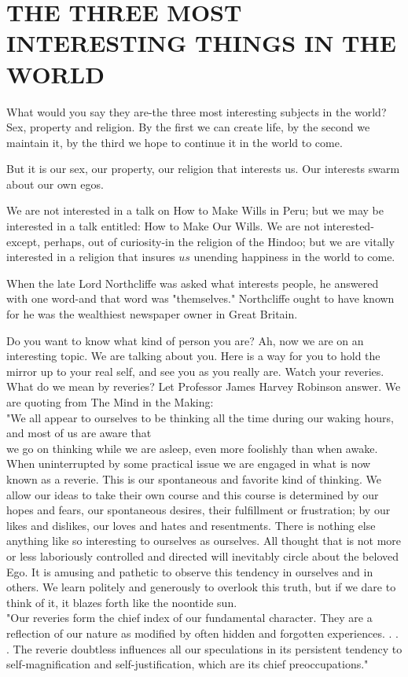\documentclass[10pt]{article}
\begin{document}
\section*{THE THREE MOST INTERESTING THINGS IN THE WORLD}
What would you say they are-the three most interesting subjects in the world? Sex, property and religion. By the first we can create life, by the second we maintain it, by the third we hope to continue it in the world to come.

But it is our sex, our property, our religion that interests us. Our interests swarm about our own egos.

We are not interested in a talk on How to Make Wills in Peru; but we may be interested in a talk entitled: How to Make Our Wills. We are not interested-except, perhaps, out of curiosity-in the religion of the Hindoo; but we are vitally interested in a religion that insures $u s$ unending happiness in the world to come.

When the late Lord Northcliffe was asked what interests people, he answered with one word-and that word was "themselves." Northcliffe ought to have known for he was the wealthiest newspaper owner in Great Britain.

Do you want to know what kind of person you are? Ah, now we are on an interesting topic. We are talking about you. Here is a way for you to hold the mirror up to your real self, and see you as you really are. Watch your reveries. What do we mean by reveries? Let Professor James Harvey Robinson answer. We are quoting from The Mind in the Making:\\
"We all appear to ourselves to be thinking all the time during our waking hours, and most of us are aware that\\
we go on thinking while we are asleep, even more foolishly than when awake. When uninterrupted by some practical issue we are engaged in what is now known as a reverie. This is our spontaneous and favorite kind of thinking. We allow our ideas to take their own course and this course is determined by our hopes and fears, our spontaneous desires, their fulfillment or frustration; by our likes and dislikes, our loves and hates and resentments. There is nothing else anything like so interesting to ourselves as ourselves. All thought that is not more or less laboriously controlled and directed will inevitably circle about the beloved Ego. It is amusing and pathetic to observe this tendency in ourselves and in others. We learn politely and generously to overlook this truth, but if we dare to think of it, it blazes forth like the noontide sun.\\
"Our reveries form the chief index of our fundamental character. They are a reflection of our nature as modified by often hidden and forgotten experiences. . . . The reverie doubtless influences all our speculations in its persistent tendency to self-magnification and self-justification, which are its chief preoccupations."
\end{document}
